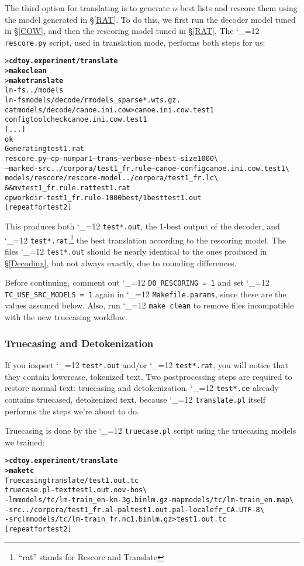 \documentclass[11pt,letterpaper]{article}
\newcommand{\bs}{\textbackslash{}}
\def\code{\begingroup\catcode`\_=12 \codex}
\newcommand{\codex}[1]{\texttt{#1}\endgroup}
\begin{document}
The third option for translating is to generate $n$-best lists and rescore
them using the model generated in \S\ref{RAT}. To do this, we first run
the decoder model tuned in \S\ref{COW}, and then the rescoring model
tuned in \S\ref{RAT}.  The \code{rescore.py} script, used in translation
mode, performs both steps for us:
\begin{small}
\begin{alltt}
   > \textbf{cd toy.experiment/translate}
   > \textbf{make clean}
   > \textbf{make translate}
   ln -fs ../models
   ln -fs models/decode/rmodels_sparse*.wts.gz .
   cat models/decode/canoe.ini.cow > canoe.ini.cow.test1
   configtool check canoe.ini.cow.test1
   [...]
   ok
   Generating test1.rat
   rescore.py --cp-numpar 1 --trans --verbose --nbest-size 1000 \bs
      --marked-src ../corpora/test1_fr.rule --canoe-config canoe.ini.cow.test1 \bs
      models/rescore/rescore-model ../corpora/test1_fr.lc \bs
      && mv test1_fr.rule.rat test1.rat
   cp workdir-test1_fr.rule-1000best/1best test1.out
   [repeat for test2]
\end{alltt}
\end{small}
This produces both \code{test*.out}, the 1-best output of the decoder, and
\code{test*.rat},\footnote{``rat'' stands for Rescore and Translate} the best translation according to the rescoring model.
The files \code{test*.out} should be nearly identical to the ones produced in
\S\ref{Decoding}, but not always exactly, due to
rounding differences.

Before continuing, comment out \code{DO_RESCORING = 1} and set
\code{TC_USE_SRC_MODELS = 1} again in \code{Makefile.params}, since these are
the values assumed below.  Also, run \code{make clean} to remove files
incompatible with the new truecasing workflow.

\subsubsection{Truecasing and Detokenization} \label{Truecasing}

If you inspect \code{test*.out} and/or \code{test*.rat}, you
will notice that they contain lowercase, tokenized text.  Two postprocessing steps
are required to restore normal text: truecasing and
detokenization.  \code{test*.ce} already
contains truecased, detokenized text, because \code{translate.pl} itself
performs the steps we're about to do.

Truecasing is done by the \code{truecase.pl} script using the truecasing models
we trained:
\begin{small}
\begin{alltt}
   > \textbf{cd toy.experiment/translate}
   > \textbf{make tc}
   Truecasing translate/test1.out.tc
   truecase.pl -text test1.out.oov -bos \bs
      -lm models/tc/lm-train_en-kn-3g.binlm.gz -map models/tc/lm-train_en.map \bs
      -src ../corpora/test1_fr.al -pal test1.out.pal -locale fr_CA.UTF-8 \bs
      -srclm models/tc/lm-train_fr.nc1.binlm.gz > test1.out.tc
   [repeat for test2]
\end{alltt}
\end{small}
\end{document}
